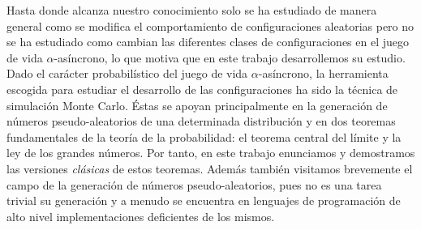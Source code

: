 \documentclass[../proyecto.tex]{memoir}
\begin{document}
Hasta donde alcanza nuestro conocimiento solo se ha estudiado de manera general como se modifica el comportamiento de configuraciones aleatorias pero no se ha estudiado como cambian las diferentes clases de configuraciones en el juego de vida $\alpha$-asíncrono, lo que motiva que en este trabajo desarrollemos su estudio. \\


Dado el carácter probabilístico del juego de vida $\alpha$-asíncrono, la herramienta escogida para estudiar el desarrollo de las configuraciones ha sido la técnica de simulación Monte Carlo. Éstas se apoyan principalmente en la generación de números pseudo-aleatorios de una determinada distribución y en dos teoremas fundamentales de la teoría de la probabilidad: el teorema central del límite y la ley de los grandes números. Por tanto, en este trabajo enunciamos y demostramos las versiones \textit{clásicas} de estos teoremas. Además también visitamos brevemente el campo de la generación de números pseudo-aleatorios, pues no es una tarea trivial su generación y a menudo se encuentra en lenguajes de programación de alto nivel implementaciones deficientes de los mismos.

\newpage
\end{document}
